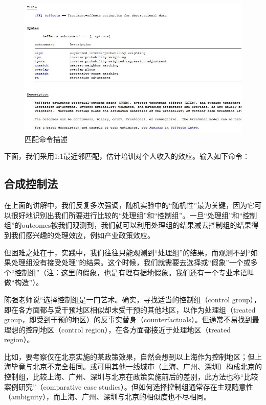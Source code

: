 \documentclass[cn,10pt,math=newtx,citestyle=gb7714-2015,bibstyle=gb7714-2015]{elegantbook}
\begin{document}
	\begin{figure}[htbp]
		\centering
		\includegraphics[width=1\textwidth]{teffects.jpg}
		\caption{匹配命令描述}\label{fig:digit}
	\end{figure}
	
	下面，我们采用1:1最近邻匹配，估计培训对个人收入的效应。输入如下命令：
	
	
	
	
	\subsection{合成控制法}
	在上面的讲解中，我们反复多次强调，随机实验中的“随机性”最为关键，因为它可以很好地识别出我们所要进行比较的“处理组”和“控制组”。一旦“处理组”和“控制组”的outcomes被我们观测到，我们就可以利用处理组的结果减去控制组的结果得到我们感兴趣的处理效应，例如产业政策效应。
	
	但困难之处在于，实践中，我们往往只能观测到“处理组”的结果，而观测不到“如果处理组没有接受处理”的结果。这个时候，我们就需要去选择或“假象”一个或多个“控制组”（注：这里的假象，也是有理有据地假象。我们还有一个专业术语叫做“构造”）。
	
	陈强老师说“选择控制组是一门艺术。确实，寻找适当的控制组（control group），即在各方面都与受干预地区相似却未受干预的其他地区，以作为处理组（treated group，即受到干预的地区）的反事实替身（counterfactuals）。但通常不易找到最理想的控制地区（control region），在各方面都接近于处理地区（treated region）。
	
	比如，要考察仅在北京实施的某政策效果，自然会想到以上海作为控制地区；但上海毕竟与北京不完全相同。或可用其他一线城市（上海、广州、深圳）构成北京的控制组，比较上海、广州、深圳与北京在政策实施前后的差别，此方法也称“比较案例研究”（comparative case studies）。但如何选择控制组通常存在主观随意性（ambiguity），而上海、广州、深圳与北京的相似度也不尽相同。
	
\end{document}
